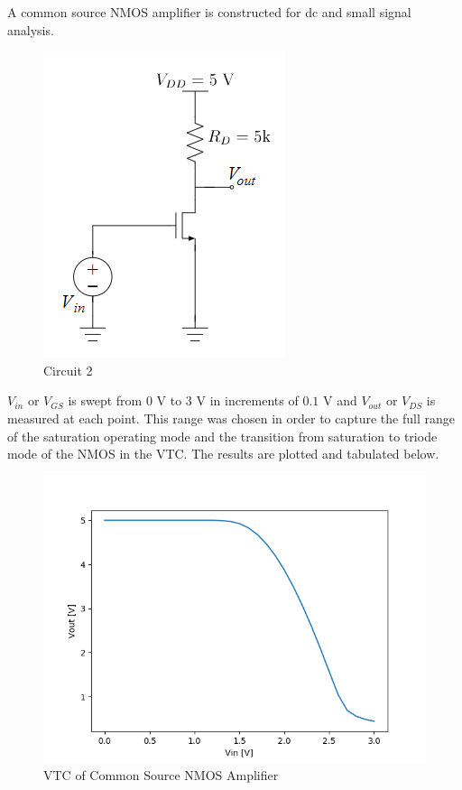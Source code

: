 A common source NMOS amplifier is constructed for dc and small signal analysis.

\FloatBarrier

\begin{figure}[h!]
	\centering
	\includegraphics[scale=0.75]{./images/circuit_2.PNG}
	\caption{Circuit 2}
	\label{fig:circuit_2}
\end{figure}

\FloatBarrier

$V_{in}$ or $V_{GS}$ is swept from $0$ \si{\volt} to $3$ \si{\volt} in increments of $0.1$ \si{\volt} and $V_{out}$ or $V_{DS}$ is measured at each point.
This range was chosen in order to capture the full range of the saturation operating mode and the transition from saturation to triode mode of the NMOS in the VTC.
The results are plotted and tabulated below.

\FloatBarrier

\begin{figure}[h!]
	\centering
	\includegraphics[scale=0.75]{./images/sim2_vtc.PNG}
	\caption{VTC of Common Source NMOS Amplifier}
	\label{fig:part2_vtc}
\end{figure}


